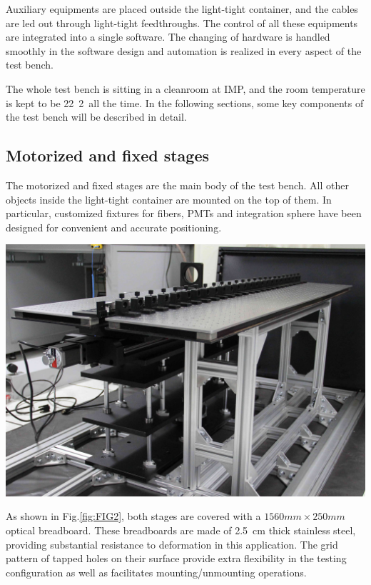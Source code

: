 \documentclass[a4paper,10pt,twoside]{cpc-hepnp}
\begin{document}
\begin{CJK*}{UTF8}{gbsn}
\begin{multicols}{2}
Auxiliary equipments are placed outside the light-tight container, and the cables are led out through light-tight feedthroughs.
The control of all these equipments are integrated into a single software. The changing of hardware is handled smoothly in the software design and automation is realized in every aspect of the test bench.

The whole test bench is sitting in a cleanroom at IMP, and the room temperature is kept to be 22\textpm~2\textcelsius~all the time. 
In the following sections, some key components of the test bench will be described in detail.

\subsection{Motorized and fixed stages}
\label{sec:stages}

The motorized and fixed stages are the main body of the test bench.
All other objects inside the light-tight container are mounted on the top of them.
In particular, customized fixtures for fibers, PMTs and integration sphere have been designed for convenient and accurate positioning.

\begin{center}
	\includegraphics[width=\linewidth]{FIG2}
\end{center} 

As shown in Fig.\ref{fig:FIG2}, both stages are covered with a $1560mm\times250mm$ optical breadboard. 
These breadboards are made of \SI{2.5}{cm} thick stainless steel, providing substantial resistance to deformation in this application. 
The grid pattern of tapped holes on their surface provide extra flexibility in the testing configuration as well as facilitates mounting/unmounting operations.


\end{multicols}
\end{CJK*}
\end{document}
